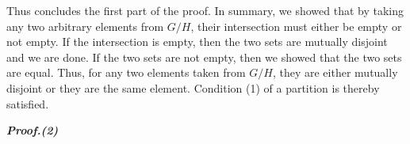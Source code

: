 \documentclass[12pt, a4paper]{article}
\begin{document}
\vspace{10mm}

Thus concludes the first part of the proof. In summary, we showed that by taking any two arbitrary elements from $G/H$, their intersection must either be empty or not empty. If the intersection is empty, then the two sets are mutually disjoint and we are done. If the two sets are not empty, then we showed that the two sets are equal. Thus, for any two elements taken from $G/H$, they are either mutually disjoint or they are the same element. Condition (1) of a partition is thereby satisfied.

\vspace{10mm}

\it\textbf{Proof.}\rm\textbf{(2)} 
\end{document}
